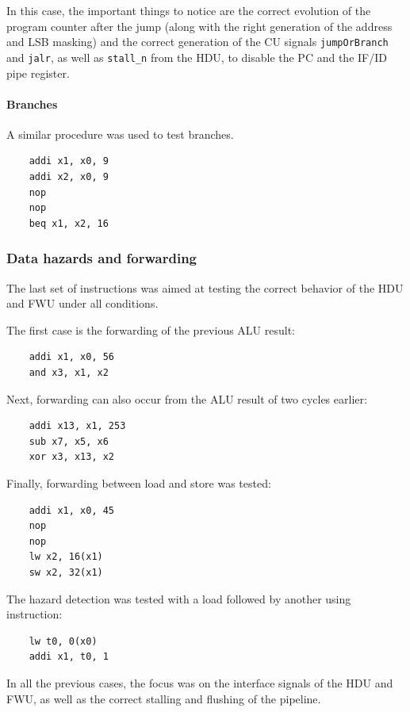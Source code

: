 \documentclass[a4paper]{article}
\begin{document}
In this case, the important things to notice are the correct evolution of the program counter after the jump (along with the right generation of the address and LSB masking) and the correct generation of the CU signals \texttt{jumpOrBranch} and \texttt{jalr}, as well as \texttt{stall\_n} from the HDU, to disable the PC and the IF/ID pipe register.

\paragraph{Branches}
A similar procedure was used to test branches. 
\begin{verbatim}
    addi x1, x0, 9
    addi x2, x0, 9
    nop
    nop
    beq x1, x2, 16
\end{verbatim}

\subsubsection{Data hazards and forwarding}
The last set of instructions was aimed at testing the correct behavior of the HDU and FWU under all conditions.

The first case is the forwarding of the previous ALU result:
\begin{verbatim}
    addi x1, x0, 56
    and x3, x1, x2
\end{verbatim}

Next, forwarding can also occur from the ALU result of two cycles earlier:
\begin{verbatim}
    addi x13, x1, 253
    sub x7, x5, x6
    xor x3, x13, x2
\end{verbatim}


Finally, forwarding between load and store was tested:
\begin{verbatim}
    addi x1, x0, 45
    nop
    nop
    lw x2, 16(x1)
    sw x2, 32(x1)
\end{verbatim}

The hazard detection was tested with a load followed by another using instruction:
\begin{verbatim}
    lw t0, 0(x0)
    addi x1, t0, 1 
\end{verbatim}

In all the previous cases, the focus was on the interface signals of the HDU and FWU, as well as the correct stalling and flushing of the pipeline.
\end{document}
